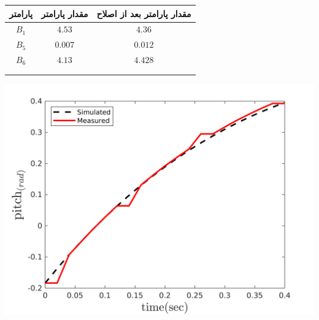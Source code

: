   \begin{minipage}[H]{\linewidth}
	\hfill
	\begin{minipage}[b]{0.49\linewidth}
		\centering
		\begin{tabular}{ccc}\hline
			پارامتر & مقدار پارامتر  & مقدار پارامتر بعد از اصلاح
			\\ \hline
			$B_1$  & $4.53$ & $4.36$ \\
			$B_5$ & $0.007$ & $0.012$\\
			$B_6$ & $4.13$ & $4.428$\\ \hline
			\\\\
		\end{tabular}
	\end{minipage}
	\begin{minipage}[b]{0.48\linewidth}
		\centering
		\includegraphics[width=1\linewidth]{../Figures/RCP/pitch_ml_parameter_estimation/RCP_pitch_S1.png}
	\end{minipage}
\end{minipage}

